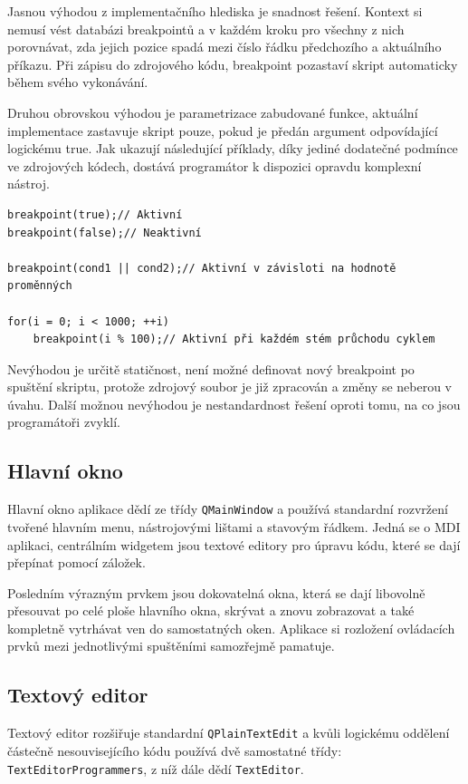 \documentclass[11pt,twoside,a4paper]{book}
\begin{document}
Jasnou výhodou z implementačního hlediska je snadnost řešení. Kontext si nemusí vést databázi breakpointů a v každém kroku pro všechny z nich porovnávat, zda jejich pozice spadá mezi číslo řádku předchozího a aktuálního příkazu. Při zápisu do zdrojového kódu, breakpoint pozastaví skript automaticky během svého vykonávání.

Druhou obrovskou výhodou je parametrizace zabudované funkce, aktuální implementace zastavuje skript pouze, pokud je předán argument odpovídající logickému true. Jak ukazují následující příklady, díky jediné dodatečné podmínce ve zdrojových kódech, dostává programátor k dispozici opravdu komplexní nástroj.

\begin{verbatim}
breakpoint(true);// Aktivní
breakpoint(false);// Neaktivní

breakpoint(cond1 || cond2);// Aktivní v závisloti na hodnotě proměnných

for(i = 0; i < 1000; ++i)
    breakpoint(i % 100);// Aktivní při každém stém průchodu cyklem
\end{verbatim}

Nevýhodou je určitě statičnost, není možné definovat nový breakpoint po spuštění skriptu, protože zdrojový soubor je již zpracován a změny se neberou v úvahu. Další možnou ne\-vý\-ho\-dou je nestandardnost řešení oproti tomu, na co jsou programátoři zvyklí.


\subsection{Hlavní okno}

Hlavní okno aplikace dědí ze třídy \texttt{QMainWindow} a používá standardní rozvržení tvořené hlavním menu, nástrojovými lištami a stavovým řádkem. Jedná se o MDI aplikaci, centrálním widgetem jsou textové editory pro úpravu kódu, které se dají přepínat pomocí záložek.

Posledním výrazným prvkem jsou dokovatelná okna, která se dají libovolně přesouvat po celé ploše hlavního okna, skrývat a znovu zobrazovat a také kompletně vytrhávat ven do samostatných oken. Aplikace si rozložení ovládacích prvků mezi jednotlivými spuštěními samozřejmě pamatuje.


\subsection{Textový editor}

Textový editor rozšiřuje standardní \texttt{QPlainTextEdit} a kvůli logickému oddělení částečně nesouvisejícího kódu používá dvě samostatné třídy: \texttt{TextEditorProgrammers}, z níž dále dědí \texttt{TextEditor}.
\end{document}
